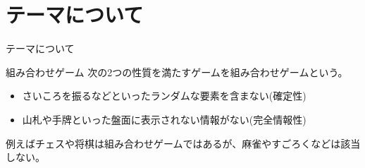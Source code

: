 \section{テーマについて}
\begin{frame}{テーマについて}
    \begin{block}{組み合わせゲーム}
        次の2つの性質を満たすゲームを組み合わせゲームという。
        \begin{itemize}
            \item さいころを振るなどといったランダムな要素を含まない(確定性)
            \item 山札や手牌といった盤面に表示されない情報がない(完全情報性)
        \end{itemize}
    \end{block}
    例えばチェスや将棋は組み合わせゲームではあるが、麻雀やすごろくなどは該当しない。\cite{combinatorial_game_theory}
\end{frame}


